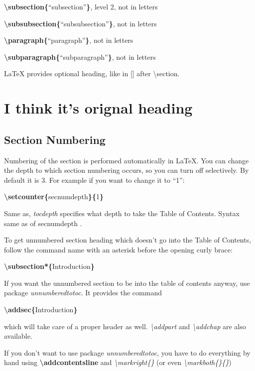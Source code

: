 \documentclass[12pt,a4paper,oneside]{article}
\begin{document}
\textbf{\textbackslash{}subsection\{}``subsection''\textbf{\}}, level 2, not in letters

\textbf{\textbackslash{}subsubsection\{}``subsubsection''\textbf{\}}, not in letters

\textbf{\textbackslash{}paragraph\{}``paragraph''\textbf{\}}, not in letters

\textbf{\textbackslash{}subparagraph\{}``subparagraph''\textbf{\}}, not in letters

{\LaTeX} provides optional heading, like in [] after \textbackslash{}section.

\section[Optional heading]{I think it's orignal heading}

\subsection{Section Numbering}

Numbering of the section is performed automatically in {\LaTeX}. You can change the depth to which section numbering occurs, so you can turn off selectively. By default it is 3. For example if you want to change it to ``1'':

\textbf{\textbackslash{}setcounter\{}secnumdepth\textbf{\}\{}1\textbf{\}}

Same as, \emph{tocdepth} specifies what depth to take the Table of Contents. Syntax same as of \bgroup secnumdepth \egroup{}.

To get unnumbered section heading which doesn't go into the Table of Contents, follow the command name with an asterisk before the opening curly brace:

\textbf{\textbackslash{}subsection*\{}Introduction\textbf{\}}

If you want the unnumbered section to be into the table of contents anyway, use package \emph{unnumberedtotoc}. It provides the command

\textbf{\textbackslash{}addsec\{}Introduction\textbf{\}}

which will take care of a proper header as well. \emph{\textbackslash{}addpart} and \emph{\textbackslash{}addchap} are also available.

If you don't want to use package \textit{unnumberedtotoc}, you have to do everything by hand using \textbf{\textbackslash{}addcontentsline} and \emph{\textbackslash{}markright\{\}} (or even \emph{\textbackslash{}markboth\{\}\{\}})
\end{document}
